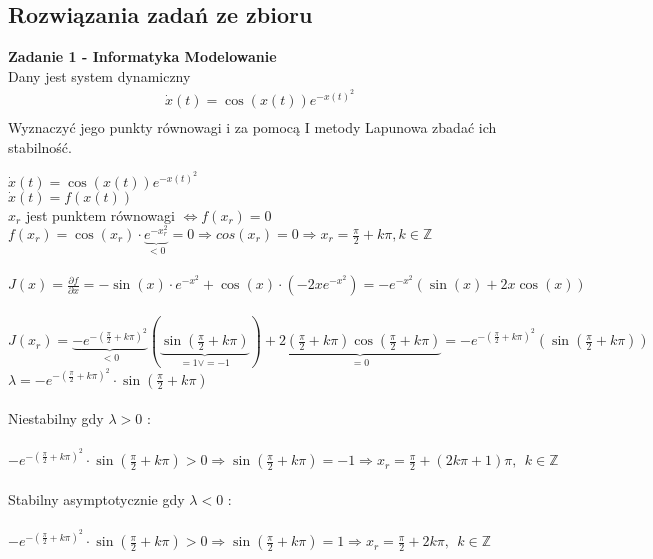 \documentclass[a4paper,11pt]{article}
\begin{document}
\newpage
\subsection{Rozwiązania zadań ze zbioru}

\begin{framed}
\textbf{Zadanie 1 - Informatyka Modelowanie } \\ 
Dany jest system dynamiczny 
\begin{align*}
\dot{x}(t)=\cos ( x(t) ) e^{-x(t)^{2}} \\
\end{align*}
Wyznaczyć jego punkty równowagi i za pomocą I metody Lapunowa zbadać ich stabilność.
\end{framed}

$\dot{x}(t)=\cos(x(t))e^{-x(t)^2}$\\
$\dot{x}(t)=f(x(t))$\\
$x_r$ jest punktem równowagi $ \Leftrightarrow f(x_r)=0$\\
$f(x_r)=\cos(x_r)\cdot \underbrace{e^{-x_r^2}}_{<0}=0 \Rightarrow cos(x_r)=0 \Rightarrow x_r=\frac{\pi}{2}+k\pi, k \in \mathbb{Z}$\\
\\
$J(x)=\frac{\partial f}{\partial x} = - \sin(x) \cdot e^{-x^2}+\cos(x) \cdot (-2xe^{-x^2})=-e^{-x^2}(\sin(x)+2x\cos(x))$\\ \\
$J(x_r)=\underbrace{-e^{-(\frac{\pi}{2}+k\pi)^2}}_{<0}(\underbrace{\sin(\frac{\pi}{2}+k\pi)}_{=1 \vee =-1})+\underbrace{2(\frac{\pi}{2}+k\pi)\cos(\frac{\pi}{2}+k\pi)}_{=0}=-e^{-(\frac{\pi}{2}+k\pi)^2} (\sin(\frac{\pi}{2}+k\pi))$\\

$\lambda = -e^{-(\frac{\pi}{2}+k\pi)^2}\cdot \sin(\frac{\pi}{2}+k\pi)$\\ \\
Niestabilny gdy \( \lambda > 0 \) :\\ \\
$ -e^{-(\frac{\pi}{2}+k\pi)^2}\cdot \sin(\frac{\pi}{2}+k\pi)>0 \Rightarrow \sin(\frac{\pi}{2}+k\pi)=-1 \Rightarrow x_r=\frac{\pi}{2}+(2k\pi+1)\pi,\ \  k \in \mathbb{Z}$\\ \\
Stabilny asymptotycznie gdy \( \lambda < 0 \) : \\ \\
$-e^{-(\frac{\pi}{2}+k\pi)^2}\cdot \sin(\frac{\pi}{2}+k\pi)>0 \Rightarrow \sin(\frac{\pi}{2}+k\pi)= 1 \Rightarrow x_r=\frac{\pi}{2}+2k\pi,\ \  k \in \mathbb{Z}$\\ 
\end{document}
